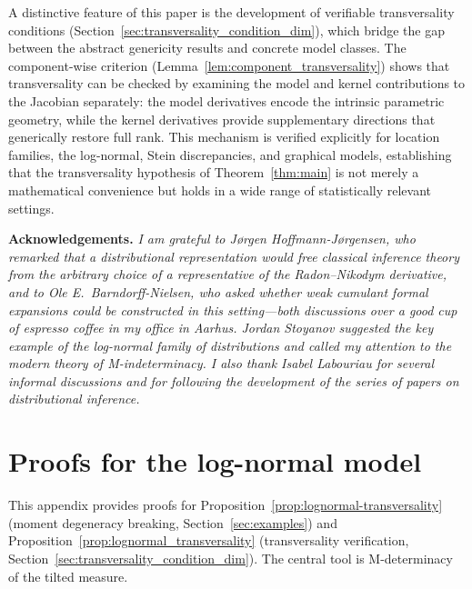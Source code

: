 \documentclass[11pt,a4paper]{article}
\begin{document}
A distinctive feature of this paper is the development of verifiable
transversality conditions
(Section~\ref{sec:transversality_condition_dim}), which bridge the
gap between the abstract genericity results and concrete model
classes.  The component-wise criterion
(Lemma~\ref{lem:component_transversality}) shows that transversality
can be checked by examining the model and kernel contributions to the
Jacobian separately: the model derivatives encode the intrinsic
parametric geometry, while the kernel derivatives provide
supplementary directions that generically restore full rank.  This
mechanism is verified explicitly for location families, the
log-normal, Stein discrepancies, and graphical models, establishing
that the transversality hypothesis of
Theorem~\ref{thm:main} is not merely a mathematical convenience
but holds in a wide range of statistically relevant settings.

\bigskip
\noindent
\textbf{Acknowledgements.}
\emph{I am grateful to J{\o}rgen Hoffmann-J{\o}rgensen, who remarked that a
distributional representation would free classical inference theory from the
arbitrary choice of a representative of the Radon--Nikodym derivative, and to
Ole E.\ Barndorff-Nielsen, who asked whether weak cumulant formal expansions
could be constructed in this setting---both discussions over a good cup of
espresso coffee in my office in Aarhus.  Jordan Stoyanov suggested the key
example of the log-normal family of distributions and called my attention to
the modern theory of M-indeterminacy.  I also thank Isabel Labouriau for
several informal discussions and for following the development of the
series of papers on distributional inference.}


\appendix

\section{Proofs for the log-normal model}
\label{app:lognormal_proofs}

This appendix provides proofs for
Proposition~\ref{prop:lognormal-transversality} (moment degeneracy
breaking, Section~\ref{sec:examples}) and
Proposition~\ref{prop:lognormal_transversality} (transversality
verification, Section~\ref{sec:transversality_condition_dim}).  The
central tool is M-determinacy of the tilted measure.
\end{document}
